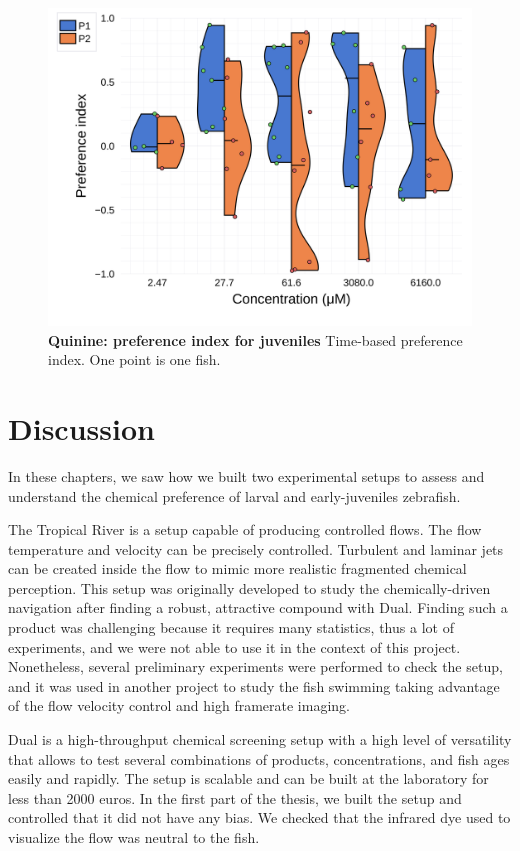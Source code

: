     \begin{figure}[h!]
      \centering
      \includegraphics[width=1\textwidth]{part_2/assets/dist_quinine.png}
      \caption{\textbf{Quinine: preference index for juveniles} Time-based preference index. One point is one fish. }
      \label{dist_quinine}
    \end{figure}

  \chapter{Discussion}
  \label{discussion}
  In these chapters, we saw how we built two experimental setups to assess and understand the chemical preference of larval and early-juveniles zebrafish.

  The Tropical River is a setup capable of producing controlled flows. The flow temperature and velocity can be precisely controlled. Turbulent and laminar jets can be created inside the flow to mimic more realistic fragmented chemical perception. This setup was originally developed to study the chemically-driven navigation after finding a robust, attractive compound with Dual. Finding such a product was challenging because it requires many statistics, thus a lot of experiments, and we were not able to use it in the context of this project. Nonetheless, several preliminary experiments were performed to check the setup, and it was used in another project to study the fish swimming taking advantage of the flow velocity control and high framerate imaging.

  Dual is a high-throughput chemical screening setup with a high level of versatility that allows to test several combinations of products, concentrations, and fish ages easily and rapidly. The setup is scalable and can be built at the laboratory for less than 2000 euros. In the first part of the thesis, we built the setup and controlled that it did not have any bias. We checked that the infrared dye used to visualize the flow was neutral to the fish.

